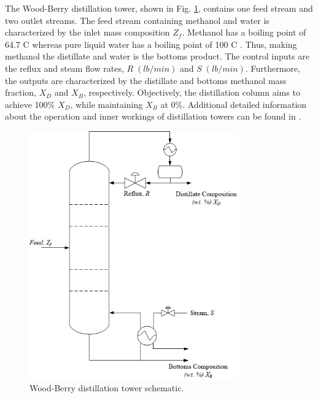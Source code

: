The Wood-Berry distillation tower, shown in Fig. \ref{fig:woodberry}, contains one feed stream and two outlet streams. The feed stream containing methanol and water is characterized by the inlet mass composition $Z_f$. Methanol has a boiling point of 64.7 \textdegree C whereas pure liquid water has a boiling point of 100 \textdegree C \cite{sonntag_thermo}. Thus, making methanol the distillate and water is the bottoms product. The control inputs are the reflux and steam flow rates, $R \; (lb/min)$ and $S \; (lb/min)$. Furthermore, the outputs are characterized by the distillate and bottoms methanol mass fraction, $X_D$ and $X_B$, respectively. Objectively, the distillation column aims to achieve 100\% $X_D$, while maintaining $X_B$ at 0\%. Additional detailed information about the operation and inner workings of distillation towers can be found in \cite{henry_distillation}.  
\begin{figure}[h]
    \begin{center}
        \includegraphics[width=9cm]{images/ftc/woodberry.png}
        \caption{\label{fig:woodberry} Wood-Berry distillation tower schematic.}
    \end{center}
\end{figure}

